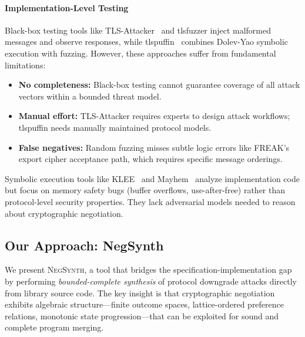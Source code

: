 \documentclass[10pt,twocolumn]{article}
\begin{document}
\paragraph{Implementation-Level Testing}
Black-box testing tools like TLS-Attacker~\cite{somorovsky2016systematic} and tlsfuzzer inject malformed messages and observe responses, while tlspuffin~\cite{ammann2024dyfuzzing} combines Dolev-Yao symbolic execution with fuzzing. However, these approaches suffer from fundamental limitations:
\begin{itemize}[leftmargin=*,noitemsep]
\item \textbf{No completeness:} Black-box testing cannot guarantee coverage of all attack vectors within a bounded threat model.
\item \textbf{Manual effort:} TLS-Attacker requires experts to design attack workflows; tlspuffin needs manually maintained protocol models.
\item \textbf{False negatives:} Random fuzzing misses subtle logic errors like FREAK's export cipher acceptance path, which requires specific message orderings.
\end{itemize}

Symbolic execution tools like KLEE~\cite{cadar2008klee} and Mayhem~\cite{cha2012mayhem} analyze implementation code but focus on memory safety bugs (buffer overflows, use-after-free) rather than protocol-level security properties. They lack adversarial models needed to reason about cryptographic negotiation.

\subsection{Our Approach: NegSynth}

We present \textsc{NegSynth}, a tool that bridges the specification-implementation gap by performing \emph{bounded-complete synthesis} of protocol downgrade attacks directly from library source code. The key insight is that cryptographic negotiation exhibits algebraic structure—finite outcome spaces, lattice-ordered preference relations, monotonic state progression—that can be exploited for sound and complete program merging.
\end{document}
